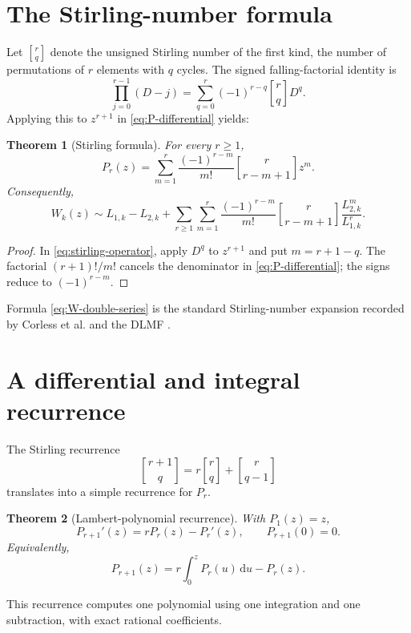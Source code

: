 \documentclass[11pt,oneside]{book}
\newtheorem{theorem}{Theorem}[chapter]
\theoremstyle{definition}
\theoremstyle{remark}
\newcommand{\dd}{\,\mathrm d}
\newcommand{\stirlingone}[2]{\genfrac{[}{]}{0pt}{}{#1}{#2}}
\begin{document}
\section{The Stirling-number formula}
Let $\stirlingone{r}{q}$ denote the unsigned Stirling number of the first kind,
the number of permutations of $r$ elements with $q$ cycles.  The signed
falling-factorial identity is
\begin{equation}\label{eq:stirling-operator}
 \prod_{j=0}^{r-1}(D-j)
 =\sum_{q=0}^{r}(-1)^{r-q}\stirlingone{r}{q}D^q.
\end{equation}
Applying this to $z^{r+1}$ in \eqref{eq:P-differential} yields:

\begin{theorem}[Stirling formula]\label{thm:P-stirling}
For every $r\ge1$,
\begin{equation}\label{eq:P-stirling}
 P_r(z)=\sum_{m=1}^{r}
 \frac{(-1)^{r-m}}{m!}
 \stirlingone{r}{r-m+1}z^m.
\end{equation}
Consequently,
\begin{equation}\label{eq:W-double-series}
 W_k(z)\sim L_{1,k}-L_{2,k}
 +\sum_{r\ge1}\sum_{m=1}^{r}
 \frac{(-1)^{r-m}}{m!}
 \stirlingone{r}{r-m+1}
 \frac{L_{2,k}^m}{L_{1,k}^r}.
\end{equation}
\end{theorem}
\begin{proof}
In \eqref{eq:stirling-operator}, apply $D^q$ to $z^{r+1}$ and put
$m=r+1-q$.  The factorial $(r+1)!/m!$ cancels the denominator in
\eqref{eq:P-differential}; the signs reduce to $(-1)^{r-m}$.
\end{proof}

Formula \eqref{eq:W-double-series} is the standard Stirling-number expansion
recorded by Corless et al. and the DLMF \cite{Corless1996,DLMF413}.

\section{A differential and integral recurrence}
The Stirling recurrence
\[
 \stirlingone{r+1}{q}=r\stirlingone{r}{q}
 +\stirlingone{r}{q-1}
\]
translates into a simple recurrence for $P_r$.

\begin{theorem}[Lambert-polynomial recurrence]\label{thm:P-recurrence}
With $P_1(z)=z$,
\begin{equation}\label{eq:P-differential-recurrence}
 P_{r+1}'(z)=rP_r(z)-P_r'(z),
 \qquad P_{r+1}(0)=0.
\end{equation}
Equivalently,
\begin{equation}\label{eq:P-integral-recurrence}
 P_{r+1}(z)=r\int_0^zP_r(u)\dd u-P_r(z).
\end{equation}
\end{theorem}
This recurrence computes one polynomial using one integration and one
subtraction, with exact rational coefficients.
\end{document}
